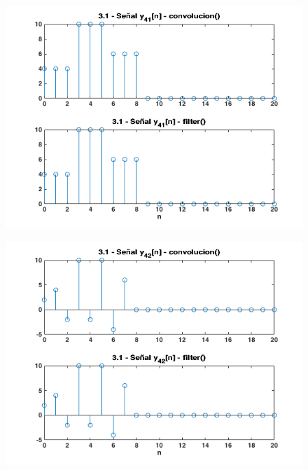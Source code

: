 \documentclass{article}
\begin{document}
\begin{figure} \caption[Figura 10]{}
	\centering
	\includegraphics[width=\linewidth]{./Figures/10.png}
\end{figure}

\begin{figure} \caption[Figura 11]{}
	\centering
	\includegraphics[width=\linewidth]{./Figures/11.png}
\end{figure}
\end{document}
